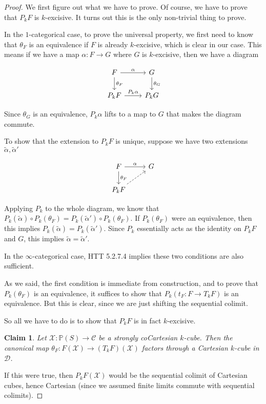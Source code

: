 \documentclass{shortart}
\newtheorem*{claim}{Claim}
\theoremstyle{definition}
\renewcommand\P{\mathbb{P}}
\begin{document}
\begin{proof}
  We first figure out what we have to prove. Of course, we have to prove that $P_k F$ is $k$-excisive. It turns out this is the only non-trivial thing to prove.

  In the $1$-categorical case, to prove the universal property, we first need to know that $\theta_F$ is an equivalence if $F$ is already $k$-excisive, which is clear in our case. This means if we have a map $\alpha: F \to G$ where $G$ is $k$-excisive, then we have a diagram
  \begin{useimager}
    \[
      \begin{tikzcd}
        F \ar[r, "\alpha"] \ar[d, "\theta_F"] & G \ar[d, "\theta_G"]\\
        P_k F \ar[r, "P_k \alpha"] & P_k G
      \end{tikzcd}
    \]
  \end{useimager}
  Since $\theta_G$ is an equivalence, $P_k\alpha$ lifts to a map to $G$ that makes the diagram commute.

  To show that the extension to $P_k F$ is unique, suppose we have two extensions $\tilde{\alpha}, \tilde{\alpha}'$
  \begin{useimager}
    \[
      \begin{tikzcd}
        F \ar[r, "\alpha"] \ar[d, "\theta_F"] & G\\
        P_k F \ar[ur, dashed]
      \end{tikzcd}
    \]
  \end{useimager}
  Applying $P_k$ to the whole diagram, we know that $P_k(\tilde{\alpha}) \circ P_k(\theta_F) = P_k(\tilde{\alpha}') \circ P_k(\theta_F)$. If $P_k(\theta_F)$ were an equivalence, then this implies $P_k(\tilde{\alpha}) = P_k(\tilde{\alpha}')$. Since $P_k$ essentially acts as the identity on $P_k F$ and $G$, this implies $\tilde{\alpha} = \tilde{\alpha}'$.

  In the $\infty$-categorical case, HTT 5.2.7.4 implies these two conditions are also sufficient.

  As we said, the first condition is immediate from construction, and to prove that $P_k(\theta_F)$ is an equivalence, it suffices to show that $P_k(t_F: F \to T_k F)$ is an equivalence. But this is clear, since we are just shifting the sequential colimit.

  So all we have to do is to show that $P_k F$ is in fact $k$-excisive.
  \begin{claim}
    Let $\mathcal{X}\colon \P(S) \to \mathcal{C}$ be a strongly coCartesian $k$-cube. Then the canonical map $\theta_F\colon F(\mathcal{X}) \to (T_kF)(\mathcal{X})$ factors through a Cartesian $k$-cube in  $\mathcal{D}$.
  \end{claim}
  If this were true, then $P_k F(\mathcal{X})$ would be the sequential colimit of Cartesian cubes, hence Cartesian (since we assumed finite limits commute with sequential colimits).


\end{proof}
\end{document}
